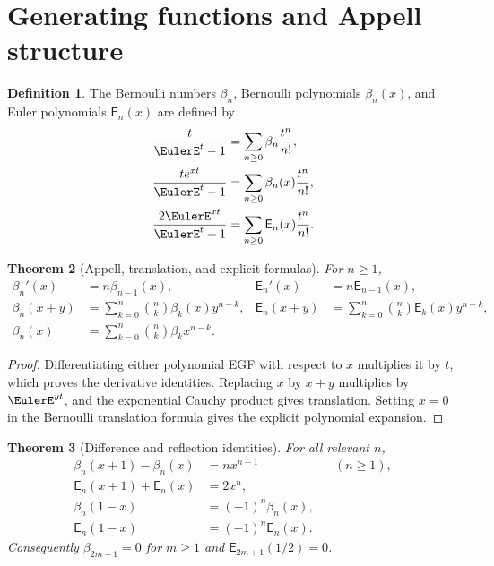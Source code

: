 \documentclass[11pt,a4paper,oneside,openany]{book}
\newtheorem{theorem}{Theorem}[chapter]
\theoremstyle{definition}
\newtheorem{definition}[theorem]{Definition}
\theoremstyle{remark}
\begin{document}
\section{Generating functions and Appell structure}

\begin{definition}
The Bernoulli numbers $\beta_n$, Bernoulli polynomials $\beta_n(x)$, and Euler
polynomials $\mathsf E_n(x)$ are defined by
\begin{align}
 \frac{t}{\EulerE^t-1}&=\sum_{n\geq0}\beta_n\frac{t^n}{n!},               \label{eq:merged-bernoulli-egf}\\
 \frac{te^{xt}}{\EulerE^t-1}&=\sum_{n\geq0}\beta_n(x)\frac{t^n}{n!},      \label{eq:merged-bernoulli-poly-egf}\\
 \frac{2\EulerE^{xt}}{\EulerE^t+1}&=\sum_{n\geq0}\mathsf E_n(x)\frac{t^n}{n!}.\label{eq:merged-euler-poly-egf}
\end{align}
\end{definition}

\begin{theorem}[Appell, translation, and explicit formulas]
\label{thm:merged-appell}
For $n\geq1$,
\begin{align}
 \beta_n'(x)&=n\beta_{n-1}(x),&
 \mathsf E_n'(x)&=n\mathsf E_{n-1}(x),                              \label{eq:merged-appell-derivative}\\
 \beta_n(x+y)&=\sum_{k=0}^{n}\binom nk\beta_k(x)y^{n-k},&
 \mathsf E_n(x+y)&=\sum_{k=0}^{n}\binom nk\mathsf E_k(x)y^{n-k},  \label{eq:merged-appell-translation}\\
 \beta_n(x)&=\sum_{k=0}^{n}\binom nk\beta_kx^{n-k}.                \label{eq:merged-bernoulli-explicit}
\end{align}
\end{theorem}

\begin{proof}
Differentiating either polynomial EGF with respect to $x$ multiplies it by
$t$, which proves the derivative identities.  Replacing $x$ by $x+y$
multiplies by $\EulerE^{yt}$, and the exponential Cauchy product gives translation.
Setting $x=0$ in the Bernoulli translation formula gives the explicit
polynomial expansion.
\end{proof}

\begin{theorem}[Difference and reflection identities]
\label{thm:merged-bernoulli-euler-basic}
For all relevant $n$,
\begin{align}
 \beta_n(x+1)-\beta_n(x)&=nx^{n-1} &&(n\geq1),                      \label{eq:merged-bernoulli-difference}\\
 \mathsf E_n(x+1)+\mathsf E_n(x)&=2x^n,                             \label{eq:merged-euler-difference}\\
 \beta_n(1-x)&=(-1)^n\beta_n(x),                                   \label{eq:merged-bernoulli-reflection}\\
 \mathsf E_n(1-x)&=(-1)^n\mathsf E_n(x).                           \label{eq:merged-euler-reflection}
\end{align}
Consequently $\beta_{2m+1}=0$ for $m\geq1$ and
$\mathsf E_{2m+1}(1/2)=0$.
\end{theorem}
\end{document}
